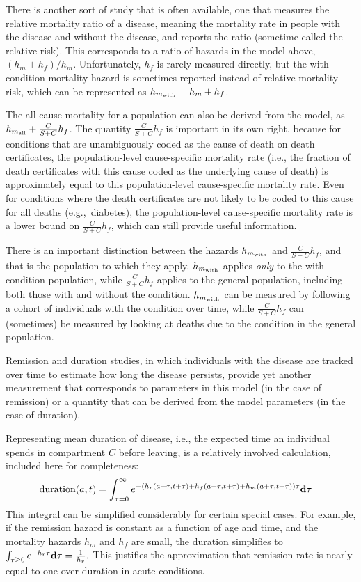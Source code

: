 There is another sort of study that is often available, one that
measures the relative mortality ratio of a disease, meaning the
mortality rate in people with the disease and without the disease, and
reports the ratio (sometime called the relative risk).  This
corresponds to a ratio of hazards in the model above, $(h_m+h_f) /
h_m$.  Unfortunately, $h_f$ is rarely measured directly, but the
with-condition mortality hazard is sometimes reported instead of
relative mortality risk, which can be represented as $h_{m_{\text{with}}} =
h_m+h_f$.

The all-cause mortality for a population can also be
derived from the model, as $h_{m_{\text{all}}} + \frac{C}{S+C}h_f$.  The quantity
$\frac{C}{S+C}h_f$ is important in its own right, because for
conditions that are unambiguously coded as the cause of death on death
certificates, the population-level cause-specific mortality rate
(i.e., the fraction of death certificates with this cause coded as the
underlying cause of death) is approximately equal to this
population-level cause-specific mortality rate.  Even for conditions
where the death certificates are not likely to be coded to this cause
for all deaths (e.g.,~diabetes), the population-level cause-specific
mortality rate is a lower bound on $\frac{C}{S+C}h_f$, which can still
provide useful information.

There is an important distinction between the hazards $h_{m_{\text{with}}}$
and $\frac{C}{S+C}h_f$, and that is the population to which they
apply. $h_{m_{\text{with}}}$ applies \emph{only} to the with-condition
population, while $\frac{C}{S+C}h_f$ applies to the general
population, including both those with and without the condition.
$h_{m_{\text{with}}}$ can be measured by following a cohort of individuals
with the condition over time, while $\frac{C}{S+C}h_f$ can (sometimes)
be measured by looking at deaths due to the condition in the general
population.

Remission and duration studies, in which individuals with the disease are
tracked over time to estimate how long the disease persists, provide
yet another measurement that corresponds to parameters in this model
(in the case of remission) or a quantity that can be derived from the
model parameters (in the case of duration).

Representing mean duration of disease, i.e., the expected time an
individual spends in compartment $C$ before leaving, is a relatively
involved calculation, included here for completeness:
\begin{align*}
\text{duration}(a, t) &
= \int_{\tau = 0}^\infty e^{-\left(h_r(a+\tau, t+\tau) + h_f(a+\tau, t+\tau) + h_m(a+\tau, t+\tau)\right) \tau}\mathbf{d} \tau
\end{align*}
This integral can be simplified considerably for certain special
cases.  For example, if the remission hazard is constant as a function
of age and time, and the mortality hazards $h_m$ and $h_f$ are small, the duration
simplifies to $\int_{\tau \geq 0} e^{-h_r\tau}\mathbf{d} \tau =
\frac{1}{h_r}.$ This justifies the approximation that remission rate is
nearly equal to one over duration in acute conditions.

